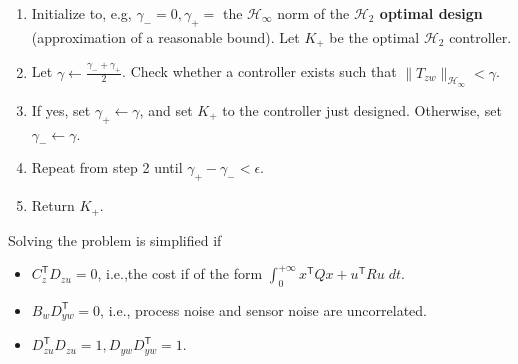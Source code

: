 \newpar{}

\begin{enumerate}
    \item Initialize to, e.g, $\gamma_-=0,\gamma_+=$ the $\mathcal{H}_\infty$ norm of the \textbf{$\mathcal{H}_2$ optimal design} (approximation of a reasonable bound). Let $K_+$ be the optimal $\mathcal{H}_2$ controller.
    \item Let $\gamma\gets \frac{\gamma_-+\gamma_+}{2}$. Check whether a controller exists such that $\|T_{zw}\|_{\mathcal{H}_\infty}<\gamma$.
    \item If yes, set $\gamma_+\leftarrow\gamma$, and set $K_+$ to the controller just designed. Otherwise, set $\gamma_-\leftarrow\gamma$.
    \item Repeat from step 2 until $\gamma_+-\gamma_-<\epsilon$.
    \item Return $K_+$.
\end{enumerate}

\newpar{}

Solving the problem is simplified if
\begin{itemize}
    \item $C_{z}^{\mathsf{T}}D_{zu}=0$, i.e.,the cost if of the form $\int_0^{+\infty}x^{\mathsf{T}}Qx+u^{\mathsf{T}}Ru\;dt$.
    \item $B_w D_{yw}^{\mathsf{T}}=0$, i.e., process noise and sensor noise are uncorrelated.
    \item $D_{zu}^{\mathsf{T}}D_{zu}=1,D_{yw}D_{yw}^{\mathsf{T}}=1$.
\end{itemize}


